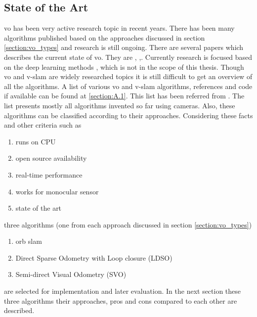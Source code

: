 \subsection{State of the Art}
\acrshort{vo} has been very active research topic in recent years. There has been many algorithms published based on the approaches discussed in section \ref{section:vo_types} and research is still ongoing. There are several papers which describes the current state of \acrshort{vo}. They are \cite{Aqel-et-al-2016}, \cite{KhalidYousif-et-al-2015} ,\cite{ScaramuzzaVO}. Currently research is focused based on the deep learning methods \cite{7989236}, \cite{yang20d3vo} which is not in the scope of this thesis. Though \acrshort{vo} and \acrshort{v-slam} are widely researched topics it is still difficult to get an overview of all the algorithms. A list of various \acrshort{vo} and \acrshort{v-slam} algorithms, references and code if available can be found at \ref{section:A.1}. This list has been referred from \cite{chris}. The list presents mostly all algorithms invented so far using cameras. Also, these algorithms can be classified according to their approaches. Considering these facts and other criteria such as
\begin{enumerate}
	\item runs on CPU 
	\item open source availability 
	\item real-time performance
	\item works for monocular sensor
	\item state of the art
\end{enumerate}	
three algorithms (one from each approach discussed in section \ref*{section:vo_types})
\begin{enumerate}
    \item \acrshort{orb} \acrshort{slam} \cite{Mur-Artal} 
    \item Direct Sparse Odometry with Loop closure (LDSO)\cite{gao2018ldso} 
  	\item Semi-direct Visual Odometry (SVO) \cite{7782863} 
\end{enumerate}	     
are selected for implementation and later evaluation. In the next section these three algorithms their approaches, pros and cons compared to each other are described.

